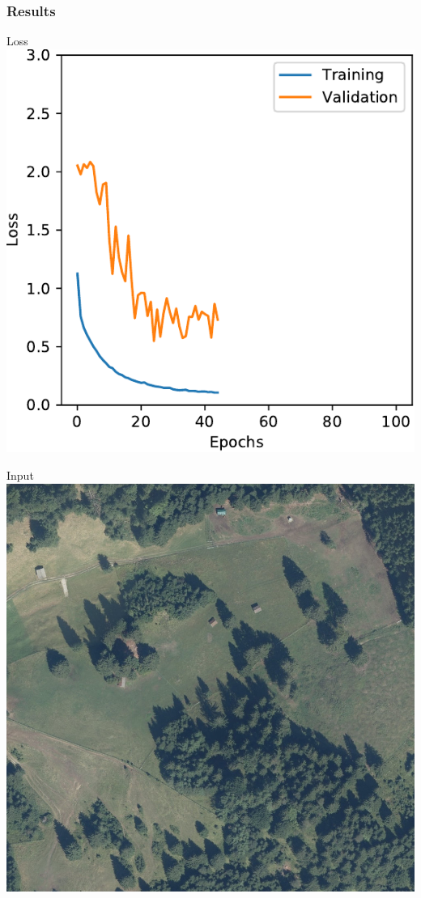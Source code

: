 \documentclass[usenames,dvipsnames,10pt]{beamer}
\begin{document}
\begin{frame}
\frametitle{Results}
\begin{minipage}[]{0.3\textwidth}
	\centering
	Loss
	\includegraphics[width=\textwidth]{graphics/loss07.pdf}
\end{minipage}
\hspace{0.25cm}
\begin{minipage}[]{0.3\textwidth}
	\centering
	Input
	\includegraphics[width=\textwidth]{graphics/aerial07.jpg}

\end{minipage}
\end{frame}
\end{document}

